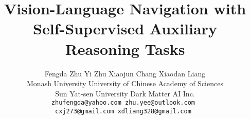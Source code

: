 \documentclass[10pt,twocolumn,letterpaper]{article}
\begin{document}
\title{Vision-Language Navigation with Self-Supervised Auxiliary Reasoning Tasks}

\author{Fengda Zhu\hspace{6mm}
Yi Zhu\hspace{6mm}
Xiaojun Chang \hspace{6mm}
Xiaodan Liang \\
Monash University \hspace{2mm} University of Chinese Academy of Sciences \\
Sun Yat-sen University \hspace{2mm} Dark Matter AI Inc.  \\
{\tt\small zhufengda@yahoo.com \hspace{2mm} zhu.yee@outlook.com } \\
{\tt\small cxj273@gmail.com \hspace{2mm} xdliang328@gmail.com }
}


\maketitle
\thispagestyle{empty}









\clearpage
\end{document}
